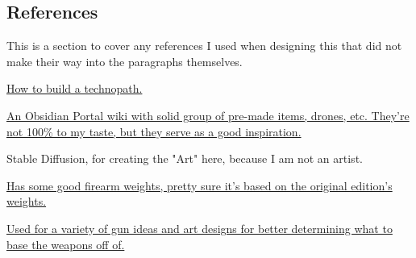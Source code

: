 \begin{multicols*}{2}
	\subsection{References}
	
	This is a section to cover any references I used when designing this that did not make their way into the paragraphs themselves.
	
	\href{https://www.ravensnpennies.com/gurps101-how-to-build-a-technopath/}{How to build a technopath.}
	
	\href{https://gurps-sr.obsidianportal.com}{An Obsidian Portal wiki with solid group of pre-made items, drones, etc. They're not 100\% to my taste, but they serve as a good inspiration.}
	
	Stable Diffusion, for creating the "Art" here, because I am not an artist.
	
	\href{http://www.ci-n.com/~jcampbel/rpgs/shadowrun/weapons.php?altskills}{Has some good firearm weights, pretty sure it's based on the original edition's weights.}
	
	\href{http://www.ambient.ca/cpunk/shadowguns/subguns.html}{Used for a variety of gun ideas and art designs for better determining what to base the weapons off of.}
	
	
\end{multicols*}